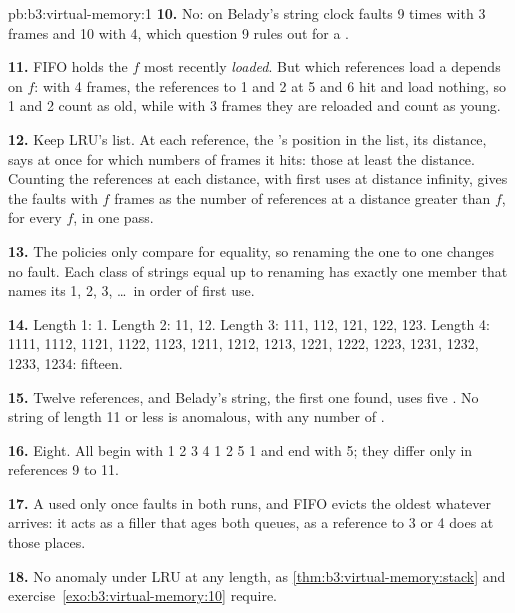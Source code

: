 \begin{solution}{pb:b3:virtual-memory:1}
\textbf{10.} No: on Belady's string clock faults 9 times with 3 frames and 10 with 4, which question 9 rules out for a .

\textbf{11.} FIFO holds the $f$  most recently \emph{loaded}. But which references load a  depends on $f$: with 4 frames, the references to 1 and 2 at 5 and 6 hit and load nothing, so 1 and 2 count as old, while with 3 frames they are reloaded and count as young.

\textbf{12.} Keep LRU's list. At each reference, the 's position in the list, its distance, says at once for which numbers of frames it hits: those at least the distance. Counting the references at each distance, with first uses at distance infinity, gives the faults with $f$ frames as the number of references at a distance greater than $f$, for every $f$, in one pass.

\textbf{13.} The policies only compare  for equality, so renaming the  one to one changes no fault. Each class of strings equal up to renaming has exactly one member that names its  1, 2, 3, \dots\ in order of first use.

\textbf{14.} Length 1: 1. Length 2: 11, 12. Length 3: 111, 112, 121, 122, 123. Length 4: 1111, 1112, 1121, 1122, 1123, 1211, 1212, 1213, 1221, 1222, 1223, 1231, 1232, 1233, 1234: fifteen.

\textbf{15.} Twelve references, and Belady's string, the first one found, uses five . No string of length 11 or less is anomalous, with any number of .

\textbf{16.} Eight. All begin with 1 2 3 4 1 2 5 1 and end with 5; they differ only in references 9 to 11.

\textbf{17.} A  used only once faults in both runs, and FIFO evicts the oldest  whatever arrives: it acts as a filler that ages both queues, as a reference to 3 or 4 does at those places.

\textbf{18.} No anomaly under LRU at any length, as \cref{thm:b3:virtual-memory:stack} and exercise~\ref{exo:b3:virtual-memory:10} require.


\end{solution}
